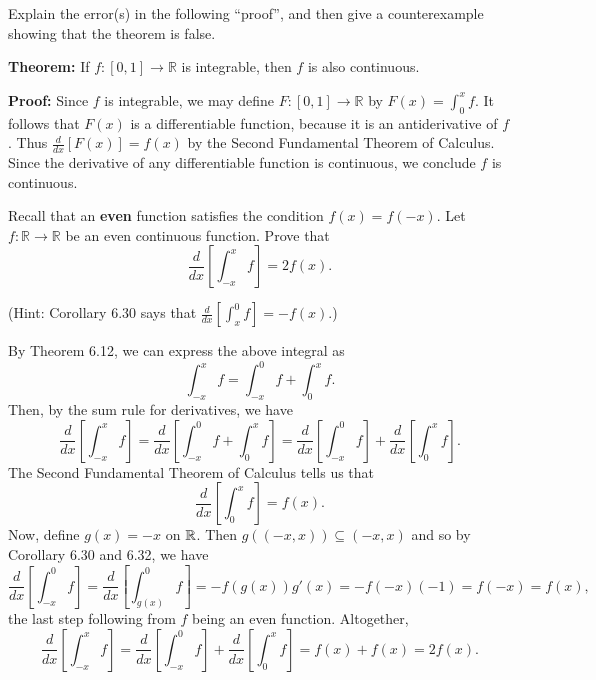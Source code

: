 \documentclass[letterpaper, twoside, 12pt]{book}
\begin{document}
\begin{exercise}[2]
Explain the error(s) in the following ``proof'',
and then give a counterexample showing that the theorem is false.

\textbf{Theorem:} If \(f:[0,1]\to\mathbb R\) is integrable, then
\(f\) is also continuous.

\textbf{Proof:}
Since \(f\) is integrable, we may define \(F:[0,1]\to\mathbb R\)
by \(F(x)=\int_0^x f\). It follows
that \(F(x)\) is a differentiable function, because it is an antiderivative
of \(f\). Thus \(\frac{d}{dx}[F(x)]=f(x)\) by the Second Fundamental
Theorem of Calculus. Since the derivative of any differentiable function
is continuous, we conclude \(f\) is continuous.
\end{exercise}
\begin{solution}

\end{solution}

\begin{exercise}[3]
Recall that an \textbf{even} function satisfies the condition \(f(x)=f(-x)\).
Let \(f:\mathbb R\to\mathbb R\) be an even continuous function.
Prove that
\[
  \frac{d}{dx}\left[\int_{-x}^x f\right]=2f(x)
.\]

(Hint: Corollary 6.30 says that \(\frac{d}{dx}[\int_{x}^0f]=-f(x)\).)
\end{exercise}

\begin{solution}
    By Theorem 6.12, we can express the above integral as
    \[ \int_{-x}^{x} f = \int_{-x}^{0} f + \int_{0}^{x} f .\]
    Then, by the sum rule for derivatives, we have
    \[ \frac{d}{dx} \left[\int_{-x}^{x} f \right] = 
    \frac{d}{dx} \left[\int_{-x}^{0} f  + \int_{0}^{x} f \right] =
    \frac{d}{dx} \left[ \int_{-x}^{0} f \right] + 
    \frac{d}{dx} \left[ \int_{0}^{x} f \right] .\]
    The Second Fundamental Theorem of Calculus tells us that 
    \[ \frac{d}{dx} \left[ \int_{0}^{x} f \right] = f(x) .\]
    Now, define \(g(x) = -x\) on \(\mathbb R\). Then 
    \(g((-x, x)) \subseteq (-x, x)\) and so by Corollary 6.30
    and 6.32, we have
    \[ \frac{d}{dx} \left[ \int_{-x}^{0} f \right] = 
       \frac{d}{dx} \left[ \int_{g(x)}^{0} f \right] =
       - f(g(x)) g'(x) = - f(-x) (-1) = f(-x) = f(x) ,\]
    the last step following from \(f\) being an even function. 
    Altogether,
    \[ \frac{d}{dx} \left[\int_{-x}^{x} f \right] = 
       \frac{d}{dx} \left[ \int_{-x}^{0} f \right] + 
       \frac{d}{dx} \left[ \int_{0}^{x} f \right]  = 
       f(x) + f(x) = 2f(x) .\]
\end{solution}
\end{document}
